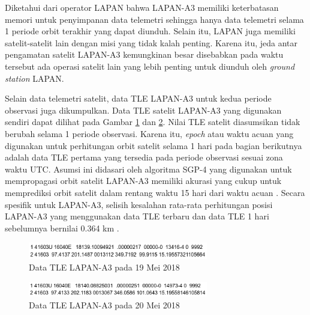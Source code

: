Diketahui dari operator LAPAN bahwa LAPAN-A3 memiliki keterbatasan memori untuk
penyimpanan data telemetri sehingga hanya data telemetri selama 1 periode orbit
terakhir yang dapat diunduh. Selain itu, LAPAN juga memiliki satelit-satelit lain
dengan misi yang tidak kalah penting. Karena itu, jeda antar pengamatan satelit
LAPAN-A3 kemungkinan besar disebabkan pada waktu tersebut ada operasi satelit lain
yang lebih penting untuk diunduh oleh \textit{ground station} LAPAN.

Selain data telemetri satelit, data TLE LAPAN-A3 untuk kedua periode observasi
juga dikumpulkan. Data TLE satelit LAPAN-A3 yang digunakan sendiri dapat
dilihat pada Gambar \ref{fig:tlea3_mei19} dan \ref{fig:tlea3_mei20}. Nilai TLE
satelit diasumsikan tidak berubah selama 1 periode observasi. Karena itu,
\textit{epoch} atau waktu acuan yang digunakan untuk perhitungan orbit satelit
selama 1 hari pada bagian berikutnya adalah data TLE pertama yang tersedia pada
periode observasi sesuai zona waktu UTC. Asumsi ini didasari oleh algoritma
SGP-4 yang digunakan untuk mempropagasi orbit satelit LAPAN-A3 memiliki akurasi
yang cukup untuk memprediksi orbit satelit dalam rentang waktu 15 hari dari
waktu acuan \cite{kelsoa}. Secara spesifik untuk LAPAN-A3, selisih kesalahan
rata-rata perhitungan posisi LAPAN-A3 yang menggunakan data TLE terbaru dan
data TLE 1 hari sebelumnya bernilai 0.364 km \cite{nugroho2018}.

\begin{figure}[H]
\setlength{}
\begin{center}
\includegraphics[width=0.7\textwidth]{fig/tlea3_2018-05-19.png}
\caption{Data TLE LAPAN-A3 pada 19 Mei 2018}
\label{fig:tlea3_mei19}
\end{center}
\end{figure}

\begin{figure}[H]
\setlength{}
\begin{center}
\includegraphics[width=0.7\textwidth]{fig/tlea3_2018-05-20.png}
\caption{Data TLE LAPAN-A3 pada 20 Mei 2018}
\label{fig:tlea3_mei20}
\end{center}
\end{figure}

